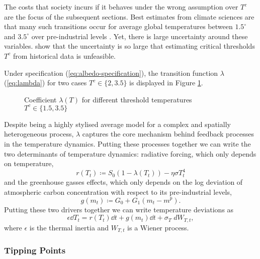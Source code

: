 \documentclass[../../main.tex]{subfiles}
\begin{document}
The costs that society incurs if it behaves under the wrong assumption over $T^c$ are the focus of the subsequent sections. Best estimates from climate sciences are that many such transitions occur for average global temperatures between $1.5^\circ$ and $3.5^\circ$ over pre-industrial levels \citep{seaver_wang_mechanisms_2023}. Yet, there is large uncertainty around these variables. \cite{ben-yami_uncertainties_2024} show that the uncertainty is so large that estimating critical thresholds $T^c$ from historical data is unfeasible.

Under specification (\ref{eq:albedo-specification}), the transition function $\lambda$ (\ref{eq:lambda}) for two cases $T^c \in \{2, 3.5\}$ is displayed in Figure \ref{fig:albedo_coefficient}. \begin{figure}[H]
    \centering
    
    \caption{Coefficient $\lambda(T)$ for different threshold temperatures $T^c \in \{1.5, 3.5\}$}
    \label{fig:albedo_coefficient}
\end{figure} Despite being a highly stylised average model for a complex and spatially heterogeneous process, $\lambda$ captures the core mechanism behind feedback processes in the temperature dynamics. Putting these processes together we can write the two determinants of temperature dynamics: radiative forcing, which only depends on temperature, \begin{equation}
    r(T_t) \coloneqq S_0 \left(1 - \lambda(T_t)\right) - \eta\sigma T_t^4
\end{equation} and the greenhouse gasses effects, which only depends on the log deviation of atmospheric carbon concentration with respect to its pre-industrial levels, \begin{equation}
    g(m_t) \coloneqq G_0 + G_1 (m_t - m^p).
\end{equation} Putting these two drivers together we can write temperature deviations as \begin{equation} \label{eq:dynamics:temperature}
    \epsilon \dd{T_t} = r(T_t) \dd{t} + g(m_t) \dd{t} + \sigma_T \; dW_{T, t}, 
\end{equation} where $\epsilon$ is the thermal inertia and $W_{T, t}$ is a Wiener process.

\subsubsection{Tipping Points}
\end{document}
